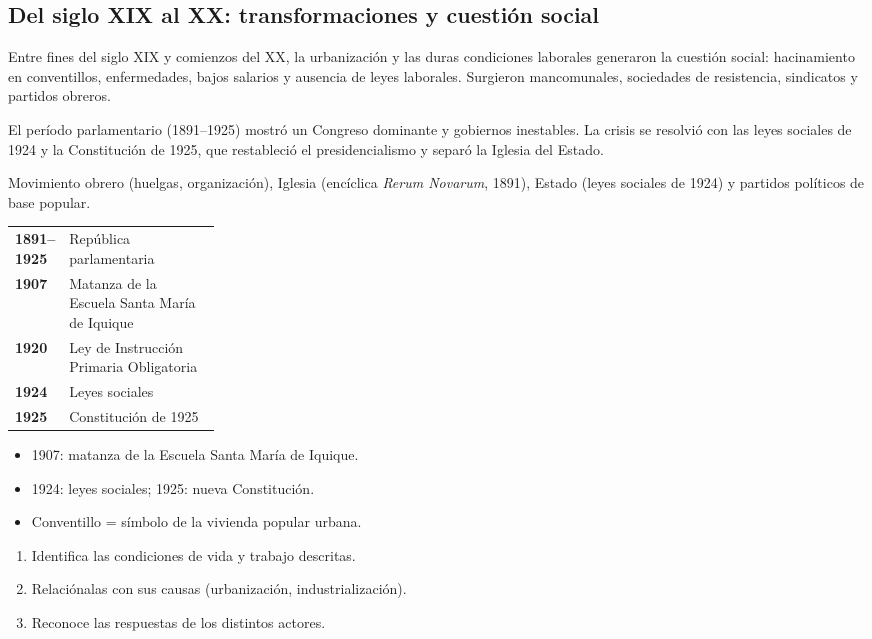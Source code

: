 \documentclass[10pt,a4paper,twocolumn]{article}
\makeatletter
\renewcommand{\arraystretch}{1.18}
\newenvironment{lineatiempo}[1][Línea de tiempo]
  {\begin{tcolorbox}[paes, acento=zinc700, title={#1}]\small\renewcommand{\arraystretch}{1.25}%
   \begin{tabular}{@{}>{\leavevmode\sffamily\bfseries\color{zinc700}}p{0.24\linewidth}p{\dimexpr0.76\linewidth-2\tabcolsep\relax}@{}}}
  {\end{tabular}\end{tcolorbox}}
\makeatother
\begin{document}
\subsection{Del siglo XIX al XX: transformaciones y cuestión social}

Entre fines del siglo XIX y comienzos del XX, la urbanización y las duras condiciones laborales generaron la cuestión social: hacinamiento en conventillos, enfermedades, bajos salarios y ausencia de leyes laborales. Surgieron mancomunales, sociedades de resistencia, sindicatos y partidos obreros.

El período parlamentario (1891–1925) mostró un Congreso dominante y gobiernos inestables. La crisis se resolvió con las leyes sociales de 1924 y la Constitución de 1925, que restableció el presidencialismo y separó la Iglesia del Estado.

\begin{definicion}
Movimiento obrero (huelgas, organización), Iglesia (encíclica \emph{Rerum Novarum}, 1891), Estado (leyes sociales de 1924) y partidos políticos de base popular.
\end{definicion}

\begin{lineatiempo}
1891–1925 & República parlamentaria \\
1907 & Matanza de la Escuela Santa María de Iquique \\
1920 & Ley de Instrucción Primaria Obligatoria \\
1924 & Leyes sociales \\
1925 & Constitución de 1925 \\
\end{lineatiempo}

\begin{ideasclave}
\begin{itemize}
  \item 1907: matanza de la Escuela Santa María de Iquique.
  \item 1924: leyes sociales; 1925: nueva Constitución.
  \item Conventillo = símbolo de la vivienda popular urbana.
\end{itemize}
\end{ideasclave}

\begin{metodo}
\begin{enumerate}
  \item Identifica las condiciones de vida y trabajo descritas.
  \item Relaciónalas con sus causas (urbanización, industrialización).
  \item Reconoce las respuestas de los distintos actores.
\end{enumerate}
\end{metodo}
\end{document}

